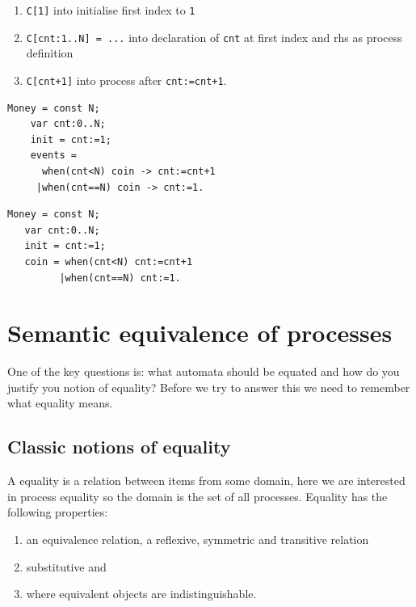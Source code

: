 \documentclass[]{article}
\begin{document}
{\begin{minipage}{0.45\textwidth}
 \end{minipage} 
 



\begin{enumerate}
\item \verb|C[1]| into initialise first index to \verb|1|
\item  \verb|C[cnt:1..N] = ...|  into declaration of \verb|cnt| at first index and rhs as process definition  
\item \verb|C[cnt+1]| into  process after \verb|cnt:=cnt+1|. 
\end{enumerate}   

\begin{center}\begin{minipage}{0.45\textwidth}
\begin{verbatim}
Money = const N;
    var cnt:0..N;
    init = cnt:=1;
    events =
      when(cnt<N) coin -> cnt:=cnt+1 
     |when(cnt==N) coin -> cnt:=1.
\end{verbatim} 
\end{minipage} 
\begin{minipage}{0.45\textwidth}
\begin{verbatim}
Money = const N;
   var cnt:0..N;
   init = cnt:=1;
   coin = when(cnt<N) cnt:=cnt+1 
         |when(cnt==N) cnt:=1.
  \end{verbatim} 
\end{minipage} \end{center}
}
\newpage
\section{Semantic equivalence  of processes}
One of the key questions is:  what automata should be equated and how do you justify you notion of equality? Before we try to answer this we need to remember what equality means.
 
 \subsection{Classic notions of equality}   A equality is a relation between  items from some domain, here we are interested in process equality so the domain is the set of all processes. Equality has the following properties:
 \begin{enumerate}
 \item an equivalence relation, a reflexive, symmetric and transitive relation 
 \item substitutive and
 \item where equivalent objects are indistinguishable.
 \end{enumerate}  
 
\end{document}

